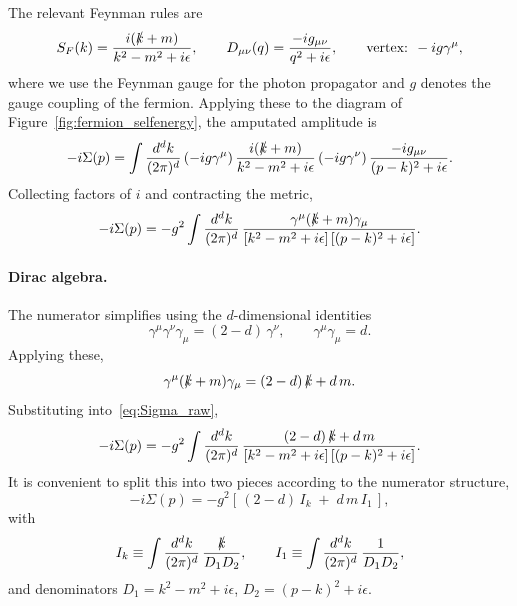 \documentclass[a4paper, 11pt]{article}
\begin{document}
\noindent The relevant Feynman rules are
\begin{equation*}
    S_F(k) = \frac{i(\slashed{k} + m)}{k^2 - m^2 + i\epsilon}, \qquad
    D_{\mu\nu}(q) = \frac{-i g_{\mu\nu}}{q^2 + i\epsilon}, \qquad
    \text{vertex: } -ig\gamma^\mu,
\end{equation*}
where we use the Feynman gauge for the photon propagator and $g$ denotes the gauge coupling of the fermion. Applying these to the diagram of Figure~\ref{fig:fermion_selfenergy}, the amputated amplitude is
\begin{equation*}
    -i\Sigma(p) = \int \frac{d^d k}{(2\pi)^d}\,
    (-ig\gamma^\mu)\,\frac{i(\slashed{k} + m)}{k^2 - m^2 + i\epsilon}\,(-ig\gamma^\nu)\,
    \frac{-i g_{\mu\nu}}{(p-k)^2 + i\epsilon}.
\end{equation*}
Collecting factors of $i$ and contracting the metric,
\begin{equation}
    -i\Sigma(p) = -g^2 \int \frac{d^d k}{(2\pi)^d}\,
    \frac{\gamma^\mu(\slashed{k} + m)\gamma_\mu}{[k^2 - m^2 + i\epsilon]\,[(p-k)^2 + i\epsilon]}.
    \label{eq:Sigma_raw}
\end{equation}

\paragraph{Dirac algebra.} The numerator simplifies using the $d$-dimensional identities
\begin{equation*}
    \gamma^\mu \gamma^\nu \gamma_\mu = (2 - d)\,\gamma^\nu, \qquad
    \gamma^\mu \gamma_\mu = d.
\end{equation*}
Applying these,
\begin{equation*}
    \gamma^\mu(\slashed{k} + m)\gamma_\mu
    = (2 - d)\,\slashed{k} + d\,m.
    \label{eq:dirac_numerator}
\end{equation*}
Substituting into~\eqref{eq:Sigma_raw},
\begin{equation*}
    -i\Sigma(p) = -g^2 \int \frac{d^d k}{(2\pi)^d}\,
    \frac{(2 - d)\,\slashed{k} + d\,m}{[k^2 - m^2 + i\epsilon]\,[(p-k)^2 + i\epsilon]}.
\end{equation*}
It is convenient to split this into two pieces according to the numerator structure,
\begin{equation*}
    -i\Sigma(p) = -g^2\left[\,(2-d)\,I_k\;+\;d\,m\,I_1\,\right],
\end{equation*}
with
\begin{equation*}
    I_k \equiv \int \frac{d^d k}{(2\pi)^d}\,
    \frac{\slashed{k}}{D_1 D_2}, \qquad
    I_1 \equiv \int \frac{d^d k}{(2\pi)^d}\,
    \frac{1}{D_1 D_2},
\end{equation*}
and denominators $D_1 = k^2 - m^2 + i\epsilon$, $D_2 = (p-k)^2 + i\epsilon$.
\end{document}

